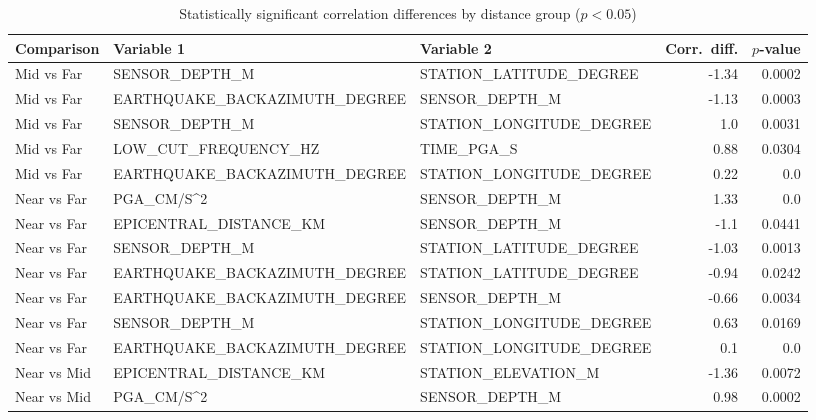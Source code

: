 \begin{table}[H]
\centering
\caption{Statistically significant correlation differences by distance group ($p < 0.05$)}
\label{tab:corr_diff}
\begin{tabular}{lllrr}
\toprule
Comparison & Variable 1 & Variable 2 & Corr.\ diff. & $p$-value \\
\midrule
Mid vs Far & SENSOR_DEPTH_M & STATION_LATITUDE_DEGREE & -1.34 & 0.0002 \\
Mid vs Far & EARTHQUAKE_BACKAZIMUTH_DEGREE & SENSOR_DEPTH_M & -1.13 & 0.0003 \\
Mid vs Far & SENSOR_DEPTH_M & STATION_LONGITUDE_DEGREE & 1.0 & 0.0031 \\
Mid vs Far & LOW_CUT_FREQUENCY_HZ & TIME_PGA_S & 0.88 & 0.0304 \\
Mid vs Far & EARTHQUAKE_BACKAZIMUTH_DEGREE & STATION_LONGITUDE_DEGREE & 0.22 & 0.0 \\
Near vs Far & PGA_CM/S^2 & SENSOR_DEPTH_M & 1.33 & 0.0 \\
Near vs Far & EPICENTRAL_DISTANCE_KM & SENSOR_DEPTH_M & -1.1 & 0.0441 \\
Near vs Far & SENSOR_DEPTH_M & STATION_LATITUDE_DEGREE & -1.03 & 0.0013 \\
Near vs Far & EARTHQUAKE_BACKAZIMUTH_DEGREE & STATION_LATITUDE_DEGREE & -0.94 & 0.0242 \\
Near vs Far & EARTHQUAKE_BACKAZIMUTH_DEGREE & SENSOR_DEPTH_M & -0.66 & 0.0034 \\
Near vs Far & SENSOR_DEPTH_M & STATION_LONGITUDE_DEGREE & 0.63 & 0.0169 \\
Near vs Far & EARTHQUAKE_BACKAZIMUTH_DEGREE & STATION_LONGITUDE_DEGREE & 0.1 & 0.0 \\
Near vs Mid & EPICENTRAL_DISTANCE_KM & STATION_ELEVATION_M & -1.36 & 0.0072 \\
Near vs Mid & PGA_CM/S^2 & SENSOR_DEPTH_M & 0.98 & 0.0002 \\
\bottomrule
\end{tabular}
\end{table}